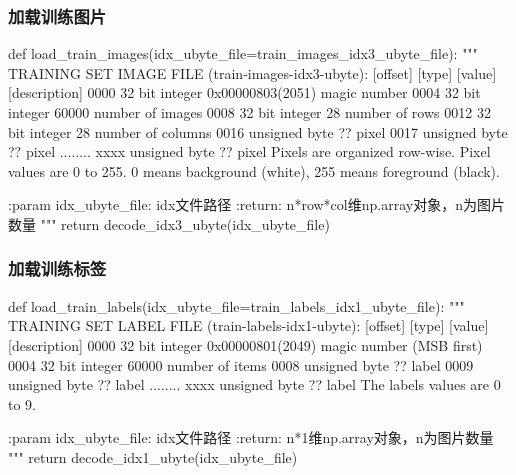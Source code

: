 \subsubsection{加载训练图片}
\begin{python}
  def load_train_images(idx_ubyte_file=train_images_idx3_ubyte_file):
    """
    TRAINING SET IMAGE FILE (train-images-idx3-ubyte):
    [offset] [type]          [value]          [description]
    0000     32 bit integer  0x00000803(2051) magic number
    0004     32 bit integer  60000            number of images
    0008     32 bit integer  28               number of rows
    0012     32 bit integer  28               number of columns
    0016     unsigned byte   ??               pixel
    0017     unsigned byte   ??               pixel
    ........
    xxxx     unsigned byte   ??               pixel
    Pixels are organized row-wise. Pixel values are 0 to 255. 0 means background (white), 255 means foreground (black).

    :param idx_ubyte_file: idx文件路径
    :return: n*row*col维np.array对象，n为图片数量
    """
    return decode_idx3_ubyte(idx_ubyte_file)
\end{python}

\subsubsection{加载训练标签}
\begin{python}
  def load_train_labels(idx_ubyte_file=train_labels_idx1_ubyte_file):
    """
    TRAINING SET LABEL FILE (train-labels-idx1-ubyte):
    [offset] [type]          [value]          [description]
    0000     32 bit integer  0x00000801(2049) magic number (MSB first)
    0004     32 bit integer  60000            number of items
    0008     unsigned byte   ??               label
    0009     unsigned byte   ??               label
    ........
    xxxx     unsigned byte   ??               label
    The labels values are 0 to 9.

    :param idx_ubyte_file: idx文件路径
    :return: n*1维np.array对象，n为图片数量
    """
    return decode_idx1_ubyte(idx_ubyte_file)
\end{python}

